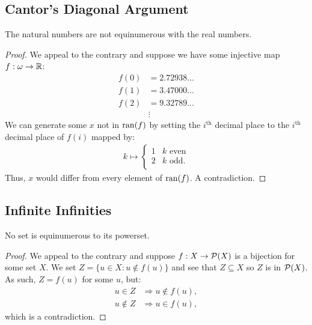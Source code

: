 \subsection{Cantor's Diagonal Argument}

The natural numbers are not equinumerous with the real numbers.

\begin{proof}
    We appeal to the contrary and suppose we have some injective map \linebreak
    $f : \omega \to \mathbb{R}$: \begin{align*}
        f(0) &= 2.72938 \ldots \\
        f(1) &= 3.47000 \ldots \\
        f(2) &= 9.32789 \ldots \\
        &\vdots 
    \end{align*} We can generate some $x$ not in $\operatorname{ran}(f)$ by
    setting the $i^{\text{th}}$ decimal place to the $i^{\text{th}}$
    decimal place of $f(i)$ mapped by: \begin{align*}
        k \mapsto \begin{cases}
            1 & k \text{ even} \\
            2 & k \text{ odd.} \\
        \end{cases}
    \end{align*} Thus, $x$ would differ from every element of $\operatorname{ran}(f)$.
    A contradiction.
\end{proof}

\subsection{Infinite Infinities}

No set is equinumerous to its powerset.

\begin{proof}
    We appeal to the contrary and suppose $f : X \to \mathcal{P}(X)$ is a bijection
    for some set $X$. We set $Z = \{u \in X : u \notin f(u)\}$ and see that
    $Z \subseteq X$ so $Z$ is in $\mathcal{P}(X)$. As such, $Z = f(u)$ for some
    $u$, but:
    \begin{align*}
        u \in Z &\Longrightarrow u \notin f(u), \\
        u \notin Z &\Longrightarrow u \in f(u),
    \end{align*} which is a contradiction.
\end{proof}

